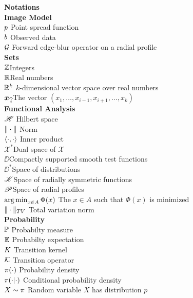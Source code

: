 {\bf {\Large Notations}} \\

{\bf {\large Image Model}}\\
$p \dotfill$ Point spread function\\
$b \dotfill$ Observed data\\
$\G \dotfill$ Forward edge-blur operator on a radial profile\\

{\bf {\large Sets}}\\
$\mathbb Z$\dotfill Integers\\
$\mathbb R$\dotfill Real numbers\\
$\mathbb R^k$  \dotfill $k$-dimensional vector space over real numbers\\
$\mbox{\boldmath$x$}_{\,\widehat{i}}$\dotfill The vector $(x_1,\dots,x_{i-1},x_{i+1},\dots,x_k)$\\

{\bf {\large Functional Analysis}}\\
$\HH \dotfill$ Hilbert space\\
$\|\cdot \| \dotfill$ Norm\\
$\langle \cdot,\cdot \rangle \dotfill$ Inner product\\
$\mathscr X^*$\dotfill Dual space of $\mathscr X$\\
$\DD$\dotfill Compactly supported smooth test functions\\
$\DD^*$\dotfill Space of distributions\\
$\mathscr K$\dotfill Space of radially symmetric functions\\
$\mathscr P$\dotfill Space of radial profiles\\
$\argmin_{x\in A} \Phi(x) \dotfill$ The $x\in A$ such that $\Phi(x)$ is minimized\\
$\|\cdot \|_{TV} \dotfill$ Total variation norm\\

{\bf {\large Probability}}\\
$\mathbb{P} \dotfill$ Probabilty measure\\
$\mathbb{E} \dotfill$ Probabilty expectation\\
$K \dotfill$ Transition kernel\\
$\K \dotfill$ Transition operator\\
$\pi(\cdot) \dotfill$ Probability density\\
$\pi(\cdot|\cdot) \dotfill$ Conditional probability density\\
$X\sim \pi \dotfill$ Random variable $X$ has distribution $p$ \\


\pagebreak
